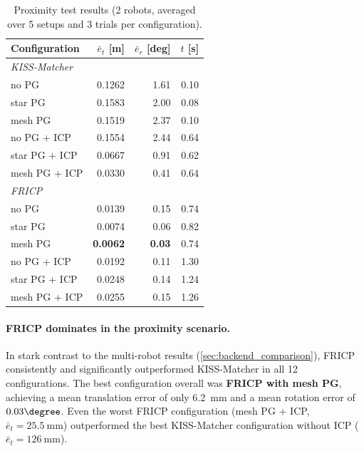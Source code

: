 \begin{table}[htbp]
    \centering
    \caption{Proximity test results (2 robots, averaged over 5 setups
             and 3 trials per configuration).}
    \label{tab:proximity_results}
    \small
    \begin{tabular}{l r r r}
        \toprule
        \textbf{Configuration}
            & $\bar{e}_t$ [m]
            & $\bar{e}_r$ [deg]
            & $t$ [s] \\
        \midrule
        \multicolumn{4}{l}{\textit{KISS-Matcher}} \\
        \quad no PG             & 0.1262  & 1.61  & 0.10 \\
        \quad star PG           & 0.1583  & 2.00  & 0.08 \\
        \quad mesh PG           & 0.1519  & 2.37  & 0.10 \\
        \quad no PG + ICP       & 0.1554  & 2.44  & 0.64 \\
        \quad star PG + ICP     & 0.0667  & 0.91  & 0.62 \\
        \quad mesh PG + ICP     & 0.0330  & 0.41  & 0.64 \\
        \midrule
        \multicolumn{4}{l}{\textit{FRICP}} \\
        \quad no PG             & 0.0139  & 0.15  & 0.74 \\
        \quad star PG           & 0.0074  & 0.06  & 0.82 \\
        \quad mesh PG           & \textbf{0.0062}  & \textbf{0.03}  & 0.74 \\
        \quad no PG + ICP       & 0.0192  & 0.11  & 1.30 \\
        \quad star PG + ICP     & 0.0248  & 0.14  & 1.24 \\
        \quad mesh PG + ICP     & 0.0255  & 0.15  & 1.26 \\
        \bottomrule
    \end{tabular}
\end{table}

\paragraph{FRICP dominates in the proximity scenario.}
In stark contrast to the multi-robot results
(\autoref{sec:backend_comparison}), FRICP consistently and
significantly outperformed KISS-Matcher in all 12 configurations.
The best configuration overall was \textbf{FRICP with mesh PG},
achieving a mean translation error of only \SI{6.2}{\milli\metre}
and a mean rotation error of $0.03\degree$.
Even the worst FRICP configuration
(mesh PG + ICP, $\bar{e}_t = \SI{25.5}{\milli\metre}$) outperformed
the best KISS-Matcher configuration without ICP
($\bar{e}_t = \SI{126}{\milli\metre}$).


